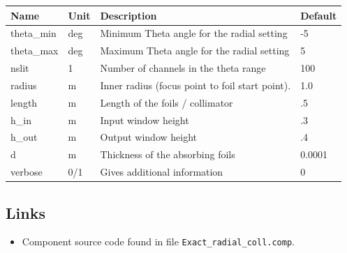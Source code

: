 \begin{longtable}{p{}p{}p{}p{}}
\toprule
\textbf{Name} & \textbf{Unit} & \textbf{Description} & \textbf{Default} \\
\midrule
\endhead
theta\_min & deg & Minimum Theta angle for the radial setting & -5 \\
theta\_max & deg & Maximum Theta angle for the radial setting & 5 \\
nslit & 1 & Number of channels in the theta range & 100 \\
radius & m & Inner radius (focus point to foil start point). & 1.0 \\
length & m & Length of the foils / collimator & .5 \\
h\_in & m & Input  window height & .3 \\
h\_out & m & Output window height & .4 \\
d & m & Thickness of the absorbing foils & 0.0001 \\
verbose & 0/1 & Gives additional information & 0 \\
\bottomrule
\end{longtable}

\subsection*{Links}
\begin{itemize}
  \item Component source code found in file \texttt{Exact\_radial\_coll.comp}.
\end{itemize}
